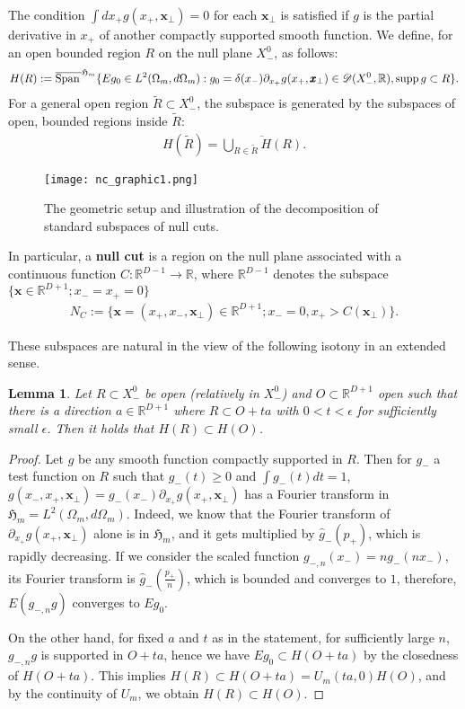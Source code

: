 \documentclass[12pt]{article}
\def\RR{{\mathbb R}}
\def\hm{\mathfrak{H}_m}
\def\Span{{\mathrm{Span}\,}}
\def\supp{{\rm supp\,}}
\def\tx{\pmb{x}}
\newtheorem{lemma}[theorem]{Lemma}
\theoremstyle{remark}
\begin{document}
The condition $\int dx_+ g(x_+, \pmb{x}_\perp) = 0$ for each $\pmb{x}_\perp$
is satisfied if $g$ is the partial derivative in $x_+$ of another compactly supported smooth function.
We define, for an open bounded region $R$ on the null plane $X^0_-$, as follows:
 \begin{align*}
  H(R):=\overline{\Span}^{\hm}{\{E g_0 \in L^2(\Omega_m,d\Omega_m):g_0=\delta(x_-)\partial_{x_+}g(x_+,\pmb{x}_\perp)\in \mathscr{D}(X_-^0,\RR), \supp g \subset R\}}.
 \end{align*}
   For a general open region $\tilde R\subset X_-^0$, the subspace is generated by the subspaces of open, bounded regions inside $\tilde R$:
   \begin{align*}
    H(\tilde R)=\overline{\bigcup_{R\in \tilde R}H(R)}.
   \end{align*}
\begin{figure}[t]
	\centering
	\texttt{[image: nc\_graphic1.png]}
	\caption{The geometric setup and illustration of the decomposition of standard subspaces of null cuts.}
	\label{fig:setup}
\end{figure}


In particular, a \textbf{null cut} is a region on the null plane associated with
a continuous function $C:\RR^{D-1}\rightarrow \RR$, where $\RR^{D-1}$ denotes the subspace $\{\pmb{x}\in \RR^{D+1};x_-=x_+=0\}$
  \begin{align*}
    N_C:=\{\pmb{x}=(x_+,x_-,\tx_\perp) \in \RR^{D+1};x_-=0,x_+>C(\pmb{x}_\perp) \}.
   \end{align*}


These subspaces are natural in the view of the following isotony in an extended sense.
\begin{lemma}\label{lm:isotony-null-space-region}
 Let $R\subset X_-^0$ be open (relatively in $X_-^0$) and $O\subset \RR^{D+1}$ open such that
 there is a direction $a \in \RR^{D+1}$ where $R\subset O + ta$ with  $0<t<\epsilon$ for sufficiently small $\epsilon$.
 Then it holds that $H(R)\subset H(O)$.
\end{lemma}
\begin{proof}
 Let $g$ be any smooth function compactly supported in $R$. Then for $g_-$ a test function on $R$
 such that $g_-(t) \ge 0$ and $\int g_-(t)dt = 1$, $g(x_-, x_+, \pmb{x}_\perp) = g_-(x_-)\partial_{x_+}g(x_+, \pmb{x}_\perp)$
 has a Fourier transform in $\hm = L^2(\Omega_m,d\Omega_m)$.
 Indeed, we know that the Fourier transform of $\partial_{x_+}g(x_+, \pmb{x}_\perp)$ alone is in $\hm$,
 and it gets multiplied by $\hat g_-(p_+)$, which is rapidly decreasing.
 If we consider the scaled function $g_{-,n}(x_-) = ng_-(nx_-)$, its Fourier transform is $\hat g_-(\frac{p_+}{n})$,
 which is bounded and converges to $1$, therefore, $E(g_{-,n}g)$ converges to $Eg_0$.

 On the other hand, for fixed $a$ and $t$ as in the statement, for sufficiently large $n$, $g_{-,n}g$ is supported in $O + ta$,
 hence we have $Eg_0 \subset H(O+ta)$ by the closedness of $H(O+ta)$.
 This implies $H(R) \subset H(O+ta) = U_m(ta,0)H(O)$, and by the continuity of $U_m$, we obtain $H(R) \subset H(O)$.
\end{proof}
\end{document}
